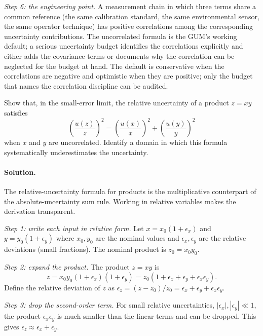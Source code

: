 \emph{Step 6: the engineering point.} A measurement chain in which
three terms share a common reference (the same calibration
standard, the same environmental sensor, the same operator
technique) has positive correlations among the corresponding
uncertainty contributions. The uncorrelated formula is the GUM's
working default; a serious uncertainty budget identifies the
correlations explicitly and either adds the covariance terms or
documents why the correlation can be neglected for the budget at
hand. The default is conservative when the correlations are
negative and optimistic when they are positive; only the budget
that names the correlation discipline can be audited.

\begin{exercise}
Show that, in the small-error limit, the relative uncertainty of a
product $z = xy$ satisfies
\[
\left(\frac{u(z)}{z}\right)^{2}
= \left(\frac{u(x)}{x}\right)^{2}
+ \left(\frac{u(y)}{y}\right)^{2}
\]
when $x$ and $y$ are uncorrelated. Identify a domain in which this
formula systematically underestimates the uncertainty.
\end{exercise}

\paragraph{Solution.}
The relative-uncertainty formula for products is the multiplicative
counterpart of the absolute-uncertainty sum rule. Working in
relative variables makes the derivation transparent.

\emph{Step 1: write each input in relative form.} Let $x =
x_{0}(1 + \epsilon_{x})$ and $y = y_{0}(1 + \epsilon_{y})$ where
$x_{0}, y_{0}$ are the nominal values and $\epsilon_{x},
\epsilon_{y}$ are the relative deviations (small fractions). The
nominal product is $z_{0} = x_{0} y_{0}$.

\emph{Step 2: expand the product.} The product $z = xy$ is
\[
z = x_{0} y_{0}(1 + \epsilon_{x})(1 + \epsilon_{y}) = z_{0}(1 +
\epsilon_{x} + \epsilon_{y} + \epsilon_{x}\epsilon_{y}).
\]
Define the relative deviation of $z$ as $\epsilon_{z} = (z - z_{0})/
z_{0} = \epsilon_{x} + \epsilon_{y} + \epsilon_{x}\epsilon_{y}$.

\emph{Step 3: drop the second-order term.} For small relative
uncertainties, $|\epsilon_{x}|, |\epsilon_{y}| \ll 1$, the product
$\epsilon_{x}\epsilon_{y}$ is much smaller than the linear terms
and can be dropped. This gives $\epsilon_{z} \approx \epsilon_{x} +
\epsilon_{y}$.

